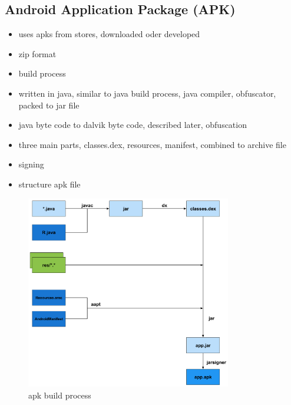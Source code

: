 \subsection{Android Application Package (APK)} \label{subsection:foundation-android-package}
\begin{itemize}
  \item uses apks from stores, downloaded oder developed
  \item zip format
  \item build process
  \item written in java, similar to java build  process, java compiler, obfuscator, packed to jar file
  \item java byte code to dalvik byte code, described later, obfuscation
  \item three main parts, classes.dex, resources, manifest, combined to archive file
  \item signing
  \item structure apk file
\end{itemize}

\begin{figure}[h]
    \centering
    \includegraphics[width=0.8\textwidth]{data/apk.png}
    \caption{\gls{apk} build process \cite{andevconDalvikART}}
    \label{fig:apk}
\end{figure}
